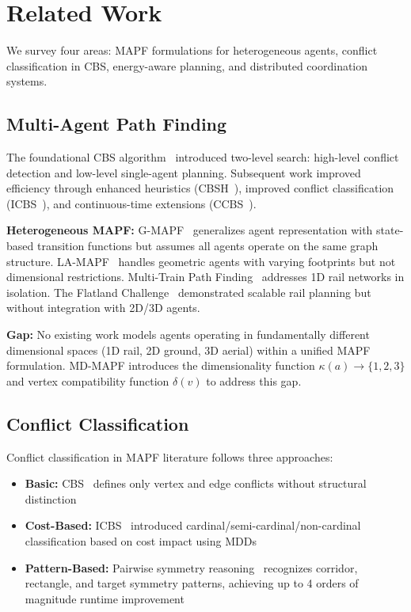 \section{Related Work}
\label{sec:related}

We survey four areas: MAPF formulations for heterogeneous agents, conflict classification in CBS, energy-aware planning, and distributed coordination systems.

\subsection{Multi-Agent Path Finding}

The foundational CBS algorithm~\cite{sharon2015cbs} introduced two-level search: high-level conflict detection and low-level single-agent planning. Subsequent work improved efficiency through enhanced heuristics (CBSH~\cite{felner2018cbsh}), improved conflict classification (ICBS~\cite{boyarski2015icbs}), and continuous-time extensions (CCBS~\cite{andreychuk2022ccbs}).

\textbf{Heterogeneous MAPF:} G-MAPF~\cite{atzmon2020gmapf} generalizes agent representation with state-based transition functions but assumes all agents operate on the same graph structure. LA-MAPF~\cite{li2019lamapf} handles geometric agents with varying footprints but not dimensional restrictions. Multi-Train Path Finding~\cite{atzmon2019trains} addresses 1D rail networks in isolation. The Flatland Challenge~\cite{li2021flatland} demonstrated scalable rail planning but without integration with 2D/3D agents.

\textbf{Gap:} No existing work models agents operating in fundamentally different dimensional spaces (1D rail, 2D ground, 3D aerial) within a unified MAPF formulation. MD-MAPF introduces the dimensionality function $\kappa(a) \rightarrow \{1,2,3\}$ and vertex compatibility function $\delta(v)$ to address this gap.

\subsection{Conflict Classification}

Conflict classification in MAPF literature follows three approaches:
\begin{itemize}
    \item \textbf{Basic:} CBS~\cite{sharon2015cbs} defines only vertex and edge conflicts without structural distinction
    \item \textbf{Cost-Based:} ICBS~\cite{boyarski2015icbs} introduced cardinal/semi-cardinal/non-cardinal classification based on cost impact using MDDs
    \item \textbf{Pattern-Based:} Pairwise symmetry reasoning~\cite{li2021symmetry} recognizes corridor, rectangle, and target symmetry patterns, achieving up to 4 orders of magnitude runtime improvement
\end{itemize}

